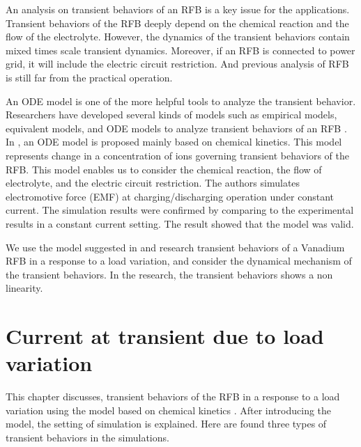 \documentclass[a4paper]{article}
\begin{document}
An analysis on transient behaviors of an RFB is a key issue for the applications. 
Transient behaviors of the RFB deeply depend on the chemical reaction and the flow of the electrolyte. 
However, the dynamics of the transient behaviors contain mixed times scale transient dynamics. 
Moreover, if an RFB is connected to power grid, it will include the electric circuit restriction. 
And previous analysis of RFB is still far from the practical operation. 

An ODE model \cite{model-minghua-dynamical-simulation} is one of the more helpful tools to analyze the transient behavior. 
Researchers have developed several kinds of models 
such as empirical models, equivalent models, and ODE models to analyze transient behaviors of an RFB \cite{eng-model-review}. 
In \cite{model-minghua-dynamical-simulation},  an ODE model is proposed mainly based on chemical kinetics. 
This model represents change in a concentration of ions governing transient behaviors of the RFB. 
This model enables us to consider the chemical reaction, the flow of electrolyte, and the electric circuit restriction. 
The authors simulates electromotive force (EMF) at charging/discharging operation under constant current. 
The simulation results were confirmed by comparing to the experimental results in a constant current setting. 
The result showed that the model was valid. 

We use the model suggested in \cite{model-minghua-dynamical-simulation} 
and research transient behaviors of a Vanadium RFB in a response to a load variation, 
and consider the dynamical mechanism of the transient behaviors. 
In the research, 
the transient behaviors shows a non linearity. 
\section{Current at transient due to load variation}
This chapter discusses, 
transient behaviors of the RFB in a response to a load variation 
using the model based on chemical kinetics \cite{model-minghua-dynamical-simulation}. 
After introducing the model, 
the setting of simulation is explained. 
Here are found three types of transient behaviors in the simulations. 
\end{document}
